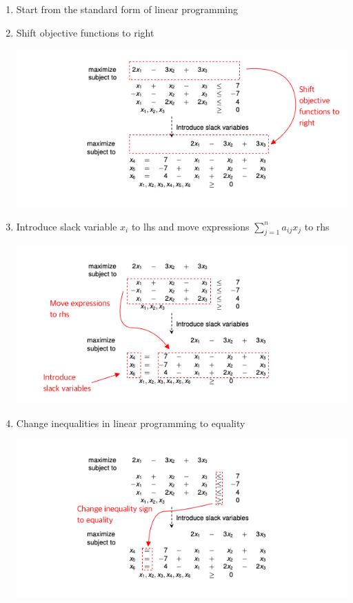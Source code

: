 \documentclass[12pt]{article}
\begin{document}
\begin{enumerate}[1.]
\begin{itemize}
        \begin{enumerate}[1)]
            \item Start from the standard form of linear programming
            \item Shift objective functions to right

            \begin{center}
            \includegraphics[width=\linewidth]{images/worksheet_6_solution_7.png}
            \end{center}

            \item Introduce slack variable $x_i$ to lhs and move expressions $\sum\limits_{j=1}^n a_{ij}x_j$ to rhs

            \begin{center}
            \includegraphics[width=\linewidth]{images/worksheet_6_solution_8.png}
            \end{center}

            \item Change inequalities in linear programming to equality

            \begin{center}
            \includegraphics[width=\linewidth]{images/worksheet_6_solution_9.png}
            \end{center}


\end{enumerate}
\end{itemize}
\end{enumerate}
\end{document}
